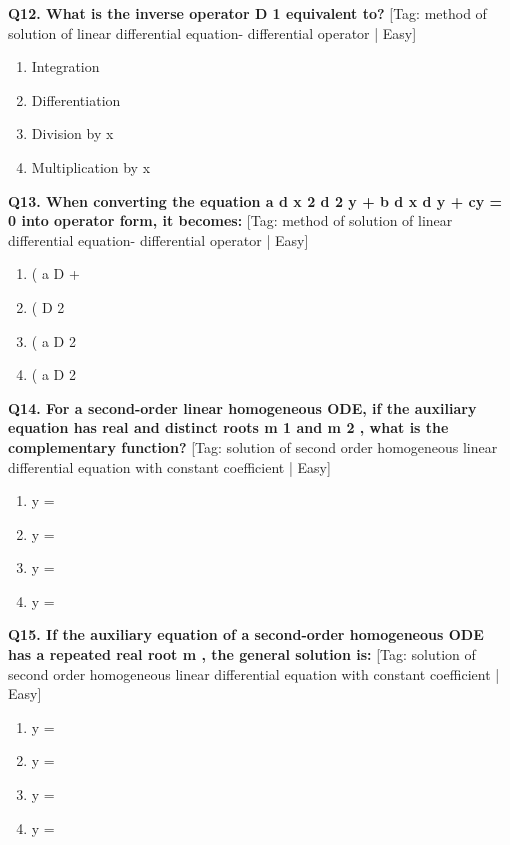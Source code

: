 \noindent\textbf{Q12. What is the inverse operator D 1 equivalent to?} \hfill [Tag: method of solution of linear differential equation- differential operator | Easy]
\begin{enumerate}[label=(\alph*),topsep=2pt,itemsep=1pt,partopsep=0pt,parsep=0pt]
    \item {{Integration}}
    \item {{Differentiation}}
    \item {{Division by x}}
    \item {{Multiplication by x}}
\end{enumerate}
\vspace{2mm}

\noindent\textbf{Q13. When converting the equation a d x 2 d 2 y + b d x d y + cy = 0 into operator form, it becomes:} \hfill [Tag: method of solution of linear differential equation- differential operator | Easy]
\begin{enumerate}[label=(\alph*),topsep=2pt,itemsep=1pt,partopsep=0pt,parsep=0pt]
    \item {{( a D +}}
    \item {{( D 2}}
    \item {{( a D 2}}
    \item {{( a D 2}}
\end{enumerate}
\vspace{2mm}

\noindent\textbf{Q14. For a second-order linear homogeneous ODE, if the auxiliary equation has real and distinct roots m 1 and m 2 , what is the complementary function?} \hfill [Tag: solution of second order homogeneous linear differential equation with constant coefficient | Easy]
\begin{enumerate}[label=(\alph*),topsep=2pt,itemsep=1pt,partopsep=0pt,parsep=0pt]
    \item {{y =}}
    \item {{y =}}
    \item {{y =}}
    \item {{y =}}
\end{enumerate}
\vspace{2mm}

\noindent\textbf{Q15. If the auxiliary equation of a second-order homogeneous ODE has a repeated real root m , the general solution is:} \hfill [Tag: solution of second order homogeneous linear differential equation with constant coefficient | Easy]
\begin{enumerate}[label=(\alph*),topsep=2pt,itemsep=1pt,partopsep=0pt,parsep=0pt]
    \item {{y =}}
    \item {{y =}}
    \item {{y =}}
    \item {{y =}}
\end{enumerate}
\vspace{2mm}

